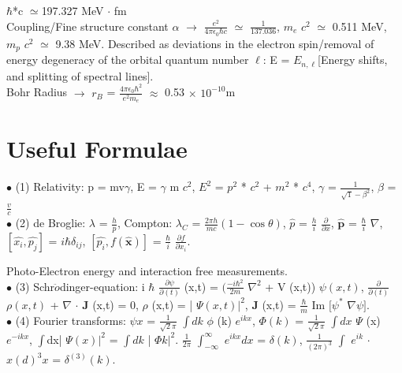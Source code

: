 \documentclass[10pt,fancy]{elegantbook}
\begin{document}
{$\hbar$*c $\simeq$197.327 MeV $ \cdot$ fm  \\

Coupling/Fine structure constant $\alpha$ $\rightarrow$ $\frac{e^2}{4 \pi \epsilon_0 \hbar c}$ $\simeq$ $\frac{1}{137.036}$, $m_e$ $c^2$ $\simeq$ 0.511 MeV, $m_p$ $c^2$ $\simeq$ 9.38 MeV. 
Described as deviations in the electron spin/removal of energy degeneracy of the orbital quantum number $\ell$:  
E = $E_{n,\ell}$[Energy shifts, and splitting of spectral lines]. \\

Bohr Radius $\longrightarrow$ $r_B$ = $\frac{4 \pi \epsilon_0 \hbar^2}{e^2{m_e}}$ $\approx$ 0.53 $\times$ $10^{-10}$m  

\section{Useful Formulae}

$\bullet$  (1) Relativity: p = mv$\gamma$, E = $\gamma$ m $c^2$, $E^2$ = $p^2$ * $c^2$ + $m^2$ * $c^4$, $\gamma$ = $\frac{1}{\sqrt1 - \beta^2}$,  
$\beta$ = $\frac{v}{c}$  \\

$\bullet$ (2) de Broglie: $\lambda$ = $\frac{h}{p}$,  Compton: $\lambda_C$ = $\frac{2 \pi h}{mc}(1 - \cos \theta)$,  $\hat{p}$ = $\frac{h}{i}$ $\frac{\partial}{\partial{x}}$,  $\hat{\mathbf p}$ = $\frac{\hbar}{i}$ $\nabla$,  $[\hat{x_i},\hat{p_j}]$ = $i\hbar \delta_{ij}$,  
$[\hat{p_i},f(\hat{\mathbf x})]$ = $\frac{\hbar}{i}$ $\frac{\partial{f}} {\partial{x_i}}$.  

Photo-Electron energy and interaction free measurements.  \\

$\bullet$ (3) Schr$\ddot{o}$dinger-equation: i $\hbar$ $\frac{\partial \psi}{\partial(t)}$ (x,t) =  $(\frac{- i \hbar^2}{2 m}$ $\nabla^2$ + V (x,t)) $\psi (x,t)$,  $\frac{\partial}{\partial(t)}$ $\rho (x,t)$ + $\nabla$ $\cdot$ $\mathbf J$ (x,t) = 0,  $\rho$ (x,t) = | $\Psi (x,t) |^2$, $\mathbf J$ (x,t) = $\frac{\hbar} {m}$ Im $[\psi^*$ $\nabla \psi]$. \\

$\bullet$ (4) Fourier transforms: $\psi x$ = $\frac{1}{\sqrt2 \pi}$ $\int{dk}$ $\phi$ (k) $e^{ikx}$, $\Phi (k)$ = $\frac{1}{\sqrt2\pi}$ $\int{dx}$ $\Psi$ (x) $e^{-ikx}$, $\int${dx}| $\Psi (x) |^2$ = $\int {dk}$ | $\Phi k |^2$.  
$\frac{1}{2\pi}$ $\int_ {-\infty}^{\infty}$ $e^{ikx}{dx}$ = $\delta(k)$, $\frac{1}{(2\pi)^3}$ $\int$ $e^{ik}$ $\cdot$ ${x}(d)^3{x}$ = $\delta^{(3)}(k)$.  \\
  
}
\end{document}

